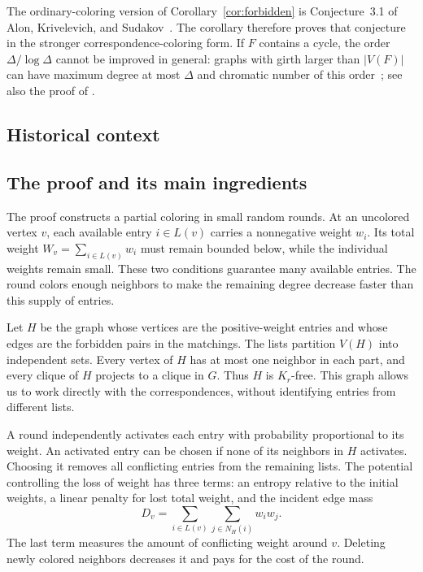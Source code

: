 The ordinary-coloring version of Corollary~\ref{cor:forbidden} is
Conjecture~3.1 of Alon, Krivelevich, and Sudakov~\cite{AKS1999}.
The corollary therefore proves that conjecture in the stronger
correspondence-coloring form. If $F$ contains a cycle, the order
$\Delta/\log\Delta$ cannot be improved in general: graphs with girth
larger than $|V(F)|$ can have maximum degree at most $\Delta$ and
chromatic number of this order~\cite{Bollobas1978}; see also the proof of
\cite[Proposition~1.2]{AKS1999}.

\subsection{Historical context}


\subsection{The proof and its main ingredients}

The proof constructs a partial coloring in small random rounds. At an
uncolored vertex $v$, each available entry $i\in L(v)$ carries a
nonnegative weight $w_i$. Its total weight
$W_v=\sum_{i\in L(v)}w_i$ must remain bounded below, while the individual
weights remain small. These two conditions guarantee many available
entries. The round colors enough neighbors to make the remaining degree
decrease faster than this supply of entries.

Let $H$ be the graph whose vertices are the positive-weight entries and
whose edges are the forbidden pairs in the matchings. The lists partition
$V(H)$ into independent sets. Every vertex of $H$ has at most one
neighbor in each part, and every clique of $H$ projects to a clique in
$G$. Thus $H$ is $K_r$-free. This graph allows us to work directly with
the correspondences, without identifying entries from different lists.

A round independently activates each entry with probability proportional
to its weight. An activated entry can be chosen if none of its neighbors
in $H$ activates. Choosing it removes all conflicting entries from the
remaining lists. The potential controlling the loss of weight has three
terms: an entropy relative to the initial weights, a linear penalty for
lost total weight, and the incident edge mass
\[
 D_v=\sum_{i\in L(v)}\sum_{j\in N_H(i)}w_iw_j.
\]
The last term measures the amount of conflicting weight around $v$.
Deleting newly colored neighbors decreases it and pays for the cost of
the round.

